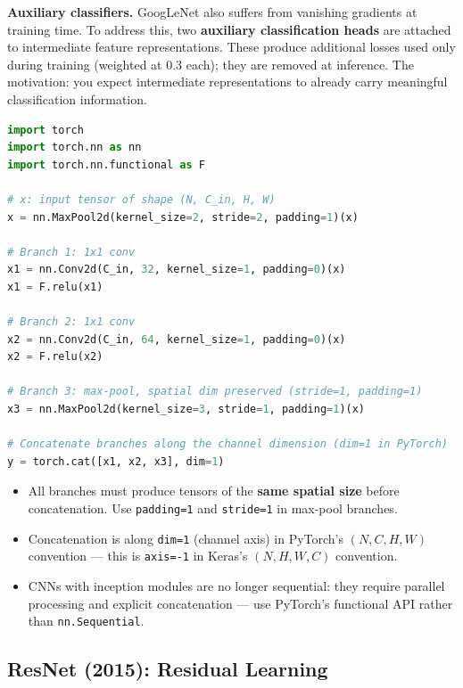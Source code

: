 \documentclass[11pt,a4paper]{article}
\begin{document}
\textbf{Auxiliary classifiers.} GoogLeNet also suffers from vanishing gradients at training time. To address this, two \textbf{auxiliary classification heads} are attached to intermediate feature representations. These produce additional losses used only during training (weighted at 0.3 each); they are removed at inference. The motivation: you expect intermediate representations to already carry meaningful classification information.

\begin{lstlisting}[language=Python, caption={Inception module in PyTorch (simplified)}]
import torch
import torch.nn as nn
import torch.nn.functional as F

# x: input tensor of shape (N, C_in, H, W)
x = nn.MaxPool2d(kernel_size=2, stride=2, padding=1)(x)

# Branch 1: 1x1 conv
x1 = nn.Conv2d(C_in, 32, kernel_size=1, padding=0)(x)
x1 = F.relu(x1)

# Branch 2: 1x1 conv
x2 = nn.Conv2d(C_in, 64, kernel_size=1, padding=0)(x)
x2 = F.relu(x2)

# Branch 3: max-pool, spatial dim preserved (stride=1, padding=1)
x3 = nn.MaxPool2d(kernel_size=3, stride=1, padding=1)(x)

# Concatenate branches along the channel dimension (dim=1 in PyTorch)
y = torch.cat([x1, x2, x3], dim=1)
\end{lstlisting}

\begin{warnbox}
\begin{itemize}
  \item All branches must produce tensors of the \textbf{same spatial size} before concatenation. Use \texttt{padding=1} and \texttt{stride=1} in max-pool branches.
  \item Concatenation is along \texttt{dim=1} (channel axis) in PyTorch's $(N,C,H,W)$ convention — this is \texttt{axis=-1} in Keras's $(N,H,W,C)$ convention.
  \item CNNs with inception modules are no longer sequential: they require parallel processing and explicit concatenation — use PyTorch's functional API rather than \texttt{nn.Sequential}.
\end{itemize}
\end{warnbox}

\subsection{ResNet (2015): Residual Learning}
\label{sec:resnet}
\end{document}
